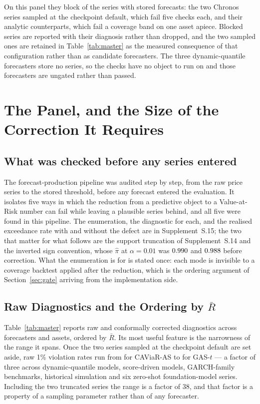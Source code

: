 \documentclass[preprint,11pt,authoryear]{elsarticle}
\newcommand{\1}{\boldsymbol{1}}
\begin{document}
On this panel they block \nGateBlocked{} of the \nGateSeries{} series with stored
forecasts: the two Chronos series sampled at the checkpoint default, which fail
five checks each, and their analytic counterparts, which fail a coverage band on
one asset apiece. Blocked series are reported with their diagnosis rather than
dropped, and the two sampled ones are retained in Table~\ref{tab:master} as the
measured consequence of that configuration rather than as candidate forecasters.
The three dynamic-quantile forecasters store no series, so the checks have no
object to run on and those forecasters are ungated rather than passed.

\section{The Panel, and the Size of the Correction It Requires}
\label{sec:results}

\subsection{What was checked before any series entered}
\label{sec:audit_trail}

The forecast-production pipeline was audited step by step, from the raw price
series to the stored threshold, before any forecast entered the evaluation. It
isolates five ways in which the reduction from a predictive object to a
Value-at-Risk number can fail while leaving a plausible series behind, and all
five were found in this pipeline. The enumeration, the diagnostic for each, and
the realised exceedance rate with and without the defect are in
Supplement~S.15; the two that matter for what follows are the support
truncation of Supplement~S.14 and the inverted sign convention, whose
$\hat\pi$ at $\alpha = 0.01$ was $0.990$ and
$0.988$ before correction. What the enumeration is for is
stated once: each mode is invisible to a coverage backtest applied after the
reduction, which is the ordering argument of Section~\ref{sec:gate} arriving
from the implementation side.

\subsection{\texorpdfstring{Raw Diagnostics and the Ordering by $\bar R$}{Raw Diagnostics and the Ordering by R}}
\label{sec:results_raw}

Table~\ref{tab:master} reports raw and conformally corrected diagnostics across
\nMainForecasters{} forecasters and \nMainAssets{} assets, ordered by $\bar R$. Its most useful feature is the
narrowness of the range it spans. Once the two series sampled at the checkpoint default are set
aside, raw 1\% violation rates run from \nMainRawPiMin{} for CAViaR-AS to \nMainRawPiMax{} for GAS-$t$
--- a factor of three across dynamic-quantile models, score-driven models,
GARCH-family benchmarks, historical simulation and six zero-shot foundation-model
series. Including the two truncated series the range is a factor of 38, and that
factor is a property of a sampling parameter rather than of any forecaster.
\end{document}
